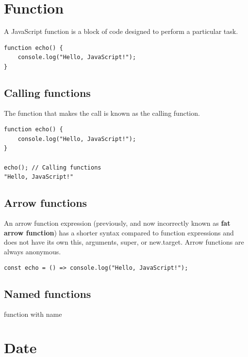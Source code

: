\documentclass[10pt]{article}
\begin{document}
	
\tableofcontents

\newpage

\section{Function}

\vbox{A JavaScript function is a block of code designed to perform a particular task. }

\begin{lstlisting}[style=ES6, caption={function}]
function echo() {
	console.log("Hello, JavaScript!");
}
\end{lstlisting}

\subsection{Calling functions}

\vbox{The function that makes the call is known as the calling function.}

\begin{lstlisting}[style=ES6, caption={Calling functions}]
function echo() {
	console.log("Hello, JavaScript!");
}

echo(); // Calling functions
"Hello, JavaScript!"
\end{lstlisting}

\subsection{Arrow functions}

\vbox{An arrow function expression (previously, and now incorrectly known as \textbf{fat arrow function}) has a shorter syntax compared to function expressions and does not have its own this, arguments, super, or new.target. Arrow functions are always anonymous.}

\begin{lstlisting}[style=ES6, caption={Calling functions}]
const echo = () => console.log("Hello, JavaScript!");
\end{lstlisting}

\subsection{Named functions}

\vbox{function with name}

\newpage

\section{Date}
\end{document}
